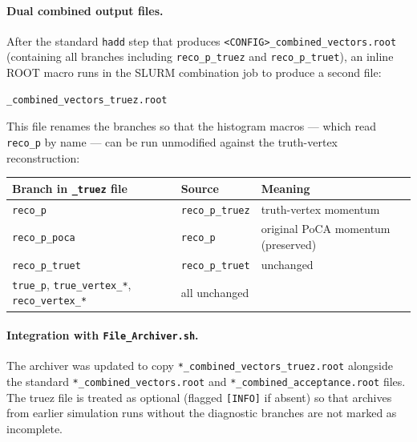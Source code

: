 \paragraph{Dual combined output files.}
After the standard \texttt{hadd} step that produces
\texttt{<CONFIG>\_combined\_vectors.root} (containing all branches including
\texttt{reco\_p\_truez} and \texttt{reco\_p\_truet}), an inline ROOT macro runs in the
SLURM combination job to produce a second file:

\begin{verbatim}
_combined_vectors_truez.root
\end{verbatim}

This file renames the branches so that the histogram macros — which read \texttt{reco\_p}
by name — can be run unmodified against the truth-vertex reconstruction:

\begin{center}
\begin{tabular}{lll}
  \toprule
  Branch in \texttt{\_truez} file & Source & Meaning \\
  \midrule
  \texttt{reco\_p}      & \texttt{reco\_p\_truez} & truth-vertex momentum \\
  \texttt{reco\_p\_poca}& \texttt{reco\_p}        & original PoCA momentum (preserved) \\
  \texttt{reco\_p\_truet} & \texttt{reco\_p\_truet} & unchanged \\
  \texttt{true\_p}, \texttt{true\_vertex\_*}, \texttt{reco\_vertex\_*}
                        & all unchanged & \\
  \bottomrule
\end{tabular}
\end{center}

\paragraph{Integration with \texttt{File\_Archiver.sh}.}
The archiver was updated to copy \texttt{*\_combined\_vectors\_truez.root} alongside
the standard \texttt{*\_combined\_vectors.root} and
\texttt{*\_combined\_acceptance.root} files.  The truez file is treated as optional
(flagged \texttt{[INFO]} if absent) so that archives from earlier simulation runs
without the diagnostic branches are not marked as incomplete.

